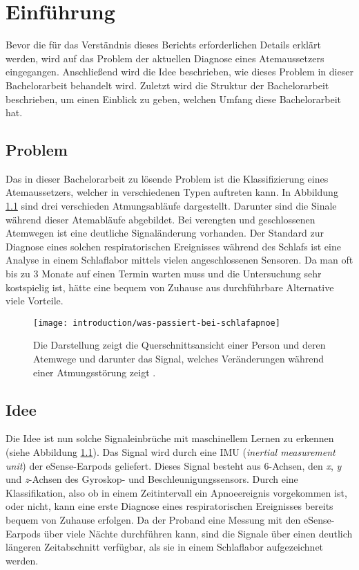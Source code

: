 
\chapter{Einführung}
\label{ch:Introduction}
Bevor die für das Verständnis dieses Berichts erforderlichen Details erklärt werden, wird auf das Problem der aktuellen Diagnose eines Atemaussetzers eingegangen. 
Anschließend wird die Idee beschrieben, wie dieses Problem in dieser Bachelorarbeit behandelt wird.
Zuletzt wird die Struktur der Bachelorarbeit beschrieben, um einen Einblick zu geben, welchen Umfang diese Bachelorarbeit hat.

\section{Problem}
Das in dieser Bachelorarbeit zu lösende Problem ist die Klassifizierung eines Atemaussetzers, welcher in verschiedenen Typen auftreten kann. 
In Abbildung \ref{introduction:problem_description} sind drei verschieden Atmungsabläufe dargestellt. 
Darunter sind die Sinale während dieser Atemabläufe abgebildet.
Bei verengten und geschlossenen Atemwegen ist eine deutliche Signaländerung vorhanden. 
Der Standard zur Diagnose eines solchen respiratorischen Ereignisses während des Schlafs ist eine Analyse in einem Schlaflabor mittels vielen angeschlossenen Sensoren. 
Da man oft bis zu 3 Monate auf einen Termin warten muss und die Untersuchung sehr kostspielig ist, hätte eine bequem von Zuhause aus durchführbare Alternative viele Vorteile.


\begin{figure}[h]
  \centering
  \texttt{[image: introduction/was-passiert-bei-schlafapnoe]}  
  \caption{Die Darstellung zeigt die Querschnittsansicht einer Person und deren Atemwege und darunter das Signal, welches Veränderungen während einer Atmungsstörung zeigt \cite{DeutscheFamilienversicherungSchlafapnoesyndrom}.}
  \label{introduction:problem_description}
\end{figure}

\newpage

\section{Idee}
Die Idee ist nun solche Signaleinbrüche mit maschinellem Lernen zu erkennen (siehe Abbildung \ref{introduction:problem_description}). 
Das Signal wird durch eine IMU (\textit{inertial measurement unit}) der eSense-Earpods geliefert.
Dieses Signal besteht aus 6-Achsen, den \textit{x}, \textit{y} und \textit{z}-Achsen des Gyroskop- und Beschleunigungssensors.
Durch eine Klassifikation, also ob in einem Zeitintervall ein Apnoeereignis vorgekommen ist, oder nicht, kann eine erste Diagnose eines respiratorischen Ereignisses bereits bequem von Zuhause erfolgen.
Da der Proband eine Messung mit den eSense-Earpods über viele Nächte durchführen kann, sind die Signale über einen deutlich längeren Zeitabschnitt verfügbar, als sie in einem Schlaflabor aufgezeichnet werden.

